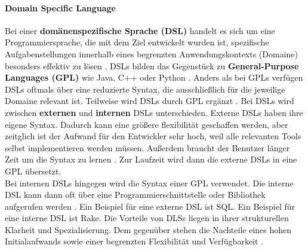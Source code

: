     \paragraph{Domain Specific Language}
    Bei einer \textbf{domänenspezifische Sprache (DSL)} handelt es sich um eine Programmiersprache, die mit dem Ziel entwickelt wurden ist, spezifische Aufgabenstellungen innerhalb eines begrenzten Anwendungskontexts (Domaine) besonders effektiv zu lösen \cite{18}.
    DSLs bilden das Gegenstück zu \textbf{General-Purpose Languages (GPL)} wie Java, C++ oder Python \cite{14}.
    Anders als bei GPLs verfügen DSLs oftmals über eine reduzierte Syntax, die ausschließlich für die jeweilige Domaine relevant ist. Teilweise wird DSLs durch GPL ergänzt \cite{18}.
    Bei DSLs wird zwischen \textbf{externen} und \textbf{internen} DSLs unterschieden. Externe DSLs haben ihre eigene Syntax. 
    Dadurch kann eine größere flexibilität geschaffen werden, aber zeitglich ist der Aufwand für den Entwickler sehr hoch, weil alle relevanten Tools selbst implementieren werden müssen. 
    Außerdem braucht der Benutzer länger Zeit um die Syntax zu lernen \cite{7}.
    Zur Laufzeit wird dann die externe DSLs in eine GPL übersetzt.\\
    Bei internen DSLs hingegen wird die Syntax einer GPL verwendet. 
    Die interne DSL kann dann oft über eine Programmierschnittstelle oder Bibliothek aufgerufen werden \cite{14}.
    Ein Beispiel für eine externe DSL ist SQL.
    Ein Beispiel für eine interne DSL ist Rake.
    Die Vorteile von DLSs liegen in ihrer strukturellen Klarheit und Spezialisierung. Dem gegenüber stehen die Nachteile eines hohen Initialaufwands sowie einer begrenzten Flexibilität und Verfügbarkeit \cite{18}.
